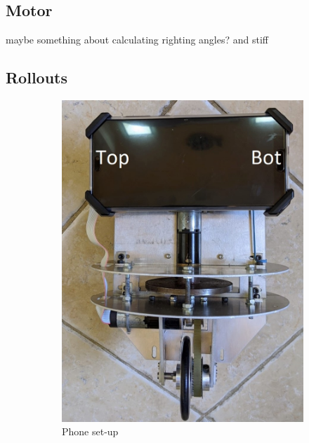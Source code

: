 \documentclass[twoside,twocolumn,12pt]{article}
\begin{document}
\subsection{Motor}
maybe something about calculating righting angles? and stiff


\subsection{Rollouts}
\onecolumn
\begin{figure}[t]
  \centering
  \begin{subfigure}[t]{0.325\textwidth}
    \includegraphics[width=\linewidth]{front_lab}
   \caption{Phone set-up}
  \label{fig:set_up}
  \end{subfigure}
  \begin{subfigure}[t]{0.325\textwidth}

\end{subfigure}
\end{figure}
\end{document}
